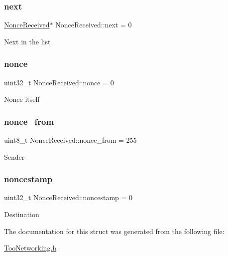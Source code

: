 \subsubsection{\texorpdfstring{next}{next}}
{\footnotesize\ttfamily \hyperlink{structNonceReceived}{Nonce\+Received}$\ast$ Nonce\+Received\+::next = 0}

Next in the list \mbox{\label{structNonceReceived_a8da2f90de05746f252706f24ec5bc539}} 
\subsubsection{\texorpdfstring{nonce}{nonce}}
{\footnotesize\ttfamily uint32\+\_\+t Nonce\+Received\+::nonce = 0}

Nonce itself \mbox{\label{structNonceReceived_aa6f2777bb591400ce057bd1fa9b23fca}} 
\subsubsection{\texorpdfstring{nonce\+\_\+from}{nonce\_from}}
{\footnotesize\ttfamily uint8\+\_\+t Nonce\+Received\+::nonce\+\_\+from = 255}

Sender \mbox{\label{structNonceReceived_ae159a71415a2908807ef1ed39f0b9dfa}} 
\subsubsection{\texorpdfstring{noncestamp}{noncestamp}}
{\footnotesize\ttfamily uint32\+\_\+t Nonce\+Received\+::noncestamp = 0}

Destination 

The documentation for this struct was generated from the following file\+:\begin{DoxyCompactItemize}
\item 
\hyperlink{TooNetworking_8h}{Too\+Networking.\+h}\end{DoxyCompactItemize}
